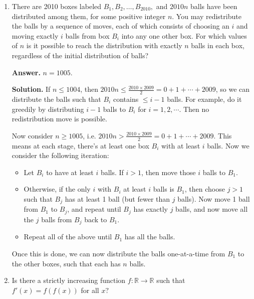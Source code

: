 \documentclass[11pt,a4paper]{article}
\newcommand{\<}{\langle}
\renewcommand{\>}{\rangle}
\begin{document}
\begin{enumerate}
\begin{itemize}
		\item If $y\neq 1$, by symmetry we can consider $y>1$ case only. Then $(y-2)^2<y^2$. 
		Then 
		\[
		x^2+y^2-(4y-4)
		= x^2+(y-2)^2
		\le (z-2)^2
		=z^2-(4z-4) =x^2+y^2-(4z-4)
		\]
		i.e. $y\ge z$, which is also contradiction. 
	\end{itemize}
	
	\item [\textbf{B3}]
	There are 2010 boxes labeled $B_1,B_2,\dots,B_{2010},$ and $2010n$ balls have been distributed among them, for some positive integer $n.$ You may redistribute the balls by a sequence of moves, each of which consists of choosing an $i$ and moving exactly $i$ balls from box $B_i$ into any one other box. For which values of $n$ is it possible to reach the distribution with exactly $n$ balls in each box, regardless of the initial distribution of balls?
	
	\textbf{Answer.} $n=1005$. 
	
	\textbf{Solution.} 
	If $n\le 1004$, then $2010n\le \frac{2010\times 2009}{2}=0+1+\cdots + 2009$, 
	so we can distribute the balls such that $B_i$ contains $\le i-1$ balls. 
	For example, do it greedily by distributing $i-1$ balls to $B_i$ for $i=1, 2, \cdots$. 
	Then no redistribution move is possible. 
	
	Now consider $n\ge 1005$, i.e. $2010n> \frac{2010\times 2009}{2}=0+1+\cdots + 2009$. 
	This means at each stage, there's at least one box $B_i$ with at least $i$ balls. 
	Now we consider the following iteration: 
	\begin{itemize}
		\item Let $B_i$ to have at least $i$ balls. 
		If $i>1$, then move those $i$ balls to $B_1$. 
		
		\item Otherwise, if the only $i$ with $B_i$ at least $i$ balls is $B_1$, 
		then choose $j>1$ such that $B_j$ has at least 1 ball (but fewer than $j$ balls). 
		Now move 1 ball from $B_1$ to $B_j$, and repeat until $B_j$ has exactly $j$ balls, 
		and now move all the $j$ balls from $B_j$ back to $B_1$. 
		
		\item Repeat all of the above until $B_1$ has all the balls. 
	\end{itemize}
    Once this is done, we can now distribute the balls one-at-a-time from $B_1$ to the other boxes, such that each has $n$ balls. 
    
    \item [\textbf{B5}] 
    Is there a strictly increasing function $f:\mathbb{R}\to\mathbb{R}$ such that $f'(x)=f(f(x))$ for all $x?$
    

\end{enumerate}
\end{document}
